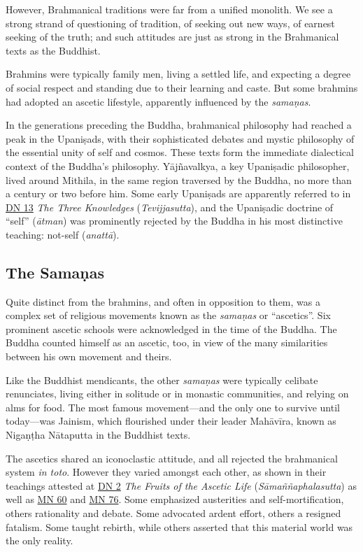 \documentclass[12pt,openany]{book}%
\begin{document}
However, Brahmanical traditions were far from a unified monolith. We see a strong strand of questioning of tradition, of seeking out new ways, of earnest seeking of the truth; and such attitudes are just as strong in the Brahmanical texts as the Buddhist.

Brahmins were typically family men, living a settled life, and expecting a degree of social respect and standing due to their learning and caste. But some brahmins had adopted an ascetic lifestyle, apparently influenced by the \textit{\textsanskrit{samaṇas}}.

In the generations preceding the Buddha, brahmanical philosophy had reached a peak in the \textsanskrit{Upaniṣads}, with their sophisticated debates and mystic philosophy of the essential unity of self and cosmos. These texts form the immediate dialectical context of the Buddha’s philosophy. \textsanskrit{Yājñavalkya}, a key \textsanskrit{Upaniṣadic} philosopher, lived around Mithila, in the same region traversed by the Buddha, no more than a century or two before him. Some early \textsanskrit{Upaniṣads} are apparently referred to in \href{/dn13}{DN 13} \textit{The Three Knowledges} (\textit{Tevijjasutta}), and the \textsanskrit{Upaniṣadic} doctrine of “self” (\textit{\textsanskrit{ātman}}) was prominently rejected by the Buddha in his most distinctive teaching: not-self (\textit{\textsanskrit{anattā}}).

\subsection*{The \textsanskrit{Samaṇas}}

Quite distinct from the brahmins, and often in opposition to them, was a complex set of religious movements known as the \textit{\textsanskrit{samaṇas}} or “ascetics”. Six prominent ascetic schools were acknowledged in the time of the Buddha. The Buddha counted himself as an ascetic, too, in view of the many similarities between his own movement and theirs.

Like the Buddhist mendicants, the other \textit{\textsanskrit{samaṇas}} were typically celibate renunciates, living either in solitude or in monastic communities, and relying on alms for food. The most famous movement—and the only one to survive until today—was Jainism, which flourished under their leader \textsanskrit{Mahāvīra}, known as \textsanskrit{Nigaṇṭha} \textsanskrit{Nātaputta} in the Buddhist texts.

The ascetics shared an iconoclastic attitude, and all rejected the brahmanical system \textit{in toto}. However they varied amongst each other, as shown in their teachings attested at \href{/dn2}{DN 2} \textit{The Fruits of the Ascetic Life} (\textit{\textsanskrit{Sāmaññaphalasutta}}) as well as \href{/mn60}{MN 60} and \href{/mn76}{MN 76}. Some emphasized austerities and self-mortification, others rationality and debate. Some advocated ardent effort, others a resigned fatalism. Some taught rebirth, while others asserted that this material world was the only reality.
\end{document}
